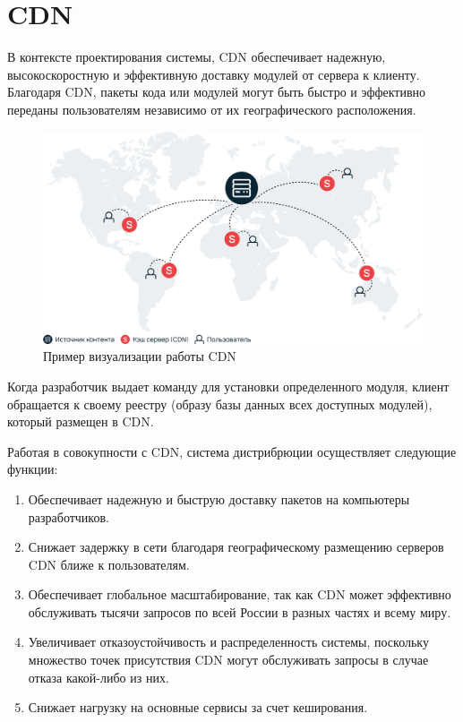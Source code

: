 \section{CDN}


В контексте проектирования системы, CDN обеспечивает надежную, высокоскоростную и эффективную доставку модулей от сервера к клиенту. Благодаря CDN, пакеты кода или модулей могут быть быстро и эффективно переданы пользователям независимо от их географического расположения.

\begin{figure}
  \centering
  \includegraphics[width=.8\textwidth]{graphics/img/sheme-cdn}
  \caption{Пример визуализации работы CDN}
  \label{fig:mono}
\end{figure}

Когда разработчик выдает команду для установки определенного модуля, клиент обращается к своему реестру (образу базы данных всех доступных модулей), который размещен в CDN.

Работая в совокупности с CDN, система дистрибрюции осуществляет следующие функции:

\begin{enumerate}
    \item Обеспечивает надежную и быструю доставку пакетов на компьютеры разработчиков.
    \item Снижает задержку в сети благодаря географическому размещению серверов CDN ближе к пользователям.
    \item Обеспечивает глобальное масштабирование, так как CDN может эффективно обслуживать тысячи запросов по всей России в разных частях и всему миру.
    \item Увеличивает отказоустойчивость и распределенность системы, поскольку множество точек присутствия CDN могут обслуживать запросы в случае отказа какой-либо из них.
    \item Снижает нагрузку на основные сервисы за счет кеширования.
\end{enumerate}

